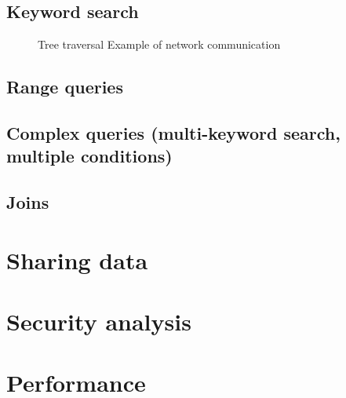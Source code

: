 \documentclass[notitlepage]{revtex4-1}
\begin{document}
\subsection{Keyword search}
\begin{figure}
	\begin{center}
        \qquad
	\end{center}
	\caption[Calibration with the condensation temperature]{
		 Tree traversal
		 Example of network communication
	}
	\label{fig:btree-protocol}
\end{figure}

\subsection{Range queries}

\subsection{Complex queries (multi-keyword search, multiple conditions)}

\subsection{Joins}

\section{Sharing data}

\section{Security analysis}

\section{Performance}


\end{document}
